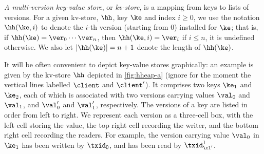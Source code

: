 \emph{A multi-version key-value store}, or \emph{kv-store}, 
is a mapping from keys to lists of versions. 
For a given kv-store, $\hh$, key $\ke$ and index $i \geq 0$, we use the notation $\hh(\ke, i)$ 
to denote the $i$-th version (starting from $0$) installed for $\ke$; that is, if $\hh(\ke) = \ver_0 \cdots\ver_{n}$, then 
$\hh(\ke, i) = \ver_{i}$ if $i \leq n$, it is undefined otherwise. We also let $\lvert \hh(\ke) \rvert = n +1 $ denote 
the length of $\hh(\ke)$.

It will be often convenient to depict key-value stores graphically: an 
example is given by the kv-store $\hh$ depicted in \cref{fig:hheap-a}
(ignore for the moment the vertical lines labelled $\client$ and $\client'$). 
It comprises two keys \( \ke_1\) and \( \ke_2 \), 
each of which is associated with two versions carrying values $\val_0$ and $\val_1$, and $\val'_0$ and $\val'_1$, respectively.
The versions of a key are listed in order from left to right. 
We represent each version as a three-cell box, with the left cell storing the value, the top right cell recording the writer, and the bottom right cell recording the readers. 
For example, the version carrying value $\val_0$ in $\ke_1$ has been written by $\txid_0$, and has been read by $\txid_{\cl'}^1$.

